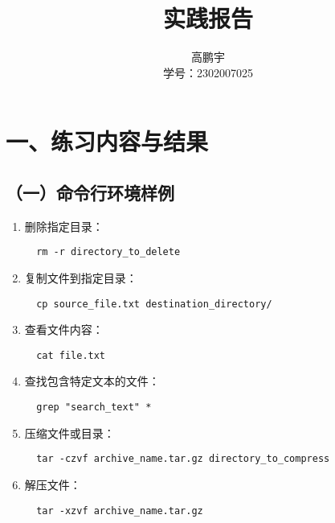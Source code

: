 \documentclass[UTF8]{ctexart}
\title{实践报告}
\author{高鹏宇\\ 学号：2302007025}
\date{}
\begin{document}
\maketitle

\section*{一、练习内容与结果}

\subsection*{（一）命令行环境样例}
\begin{enumerate}
  \item 删除指定目录：
  \begin{verbatim}
  rm -r directory_to_delete
  \end{verbatim}
  
  \item 复制文件到指定目录：
  \begin{verbatim}
  cp source_file.txt destination_directory/
  \end{verbatim}
  
  \item 查看文件内容：
  \begin{verbatim}
  cat file.txt
  \end{verbatim}
  
  \item 查找包含特定文本的文件：
  \begin{verbatim}
  grep "search_text" *
  \end{verbatim}
  
  \item 压缩文件或目录：
  \begin{verbatim}
  tar -czvf archive_name.tar.gz directory_to_compress
  \end{verbatim}
  
  \item 解压文件：
  \begin{verbatim}
  tar -xzvf archive_name.tar.gz
  \end{verbatim}
\end{enumerate}
\end{document}
